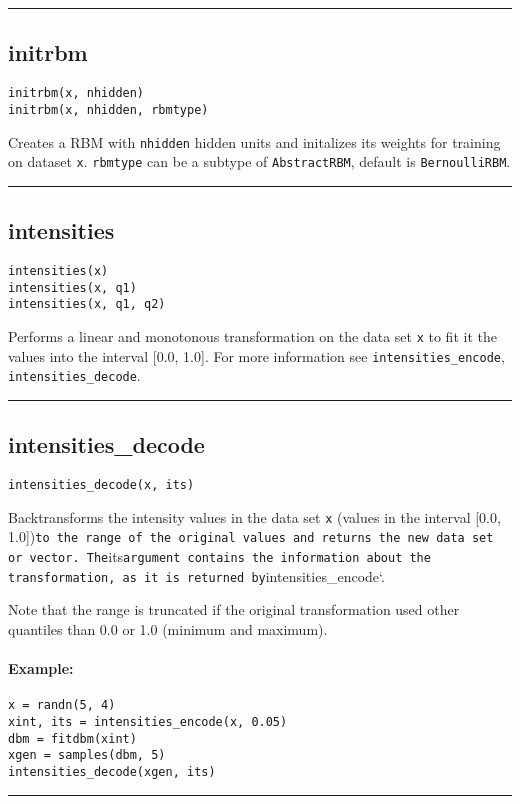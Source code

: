 \noindent\rule{\textwidth}{1pt}
\subsection*{initrbm}  \label{bms_initrbm}
\begin{verbatim}
initrbm(x, nhidden)
initrbm(x, nhidden, rbmtype)
\end{verbatim}
Creates a RBM with \texttt{nhidden} hidden units and initalizes its weights for training on dataset \texttt{x}. \texttt{rbmtype} can be a subtype of \texttt{AbstractRBM}, default is \texttt{BernoulliRBM}.

\noindent\rule{\textwidth}{1pt}
\subsection*{intensities}  \label{bms_intensities}
\begin{verbatim}
intensities(x)
intensities(x, q1)
intensities(x, q1, q2)
\end{verbatim}
Performs a linear and monotonous transformation on the data set \texttt{x} to fit it the values into the interval [0.0, 1.0]. For more information see \texttt{intensities\_encode}, \texttt{intensities\_decode}.

\noindent\rule{\textwidth}{1pt}
\subsection*{intensities\_decode}  \label{bms_intensities_decode}
\begin{verbatim}
intensities_decode(x, its)
\end{verbatim}
Backtransforms the intensity values in the data set \texttt{x} (values in the interval [0.0, 1.0])\texttt{to the range of the original values and returns the new data set or vector. The}its\texttt{argument contains the information about the transformation, as it is returned by}intensities\_encode`.

Note that the range is truncated if the original transformation used other quantiles than 0.0 or 1.0 (minimum and maximum).

\paragraph*{Example:}
\begin{verbatim}
x = randn(5, 4)
xint, its = intensities_encode(x, 0.05)
dbm = fitdbm(xint)
xgen = samples(dbm, 5)
intensities_decode(xgen, its)
\end{verbatim}
\noindent\rule{\textwidth}{1pt}
